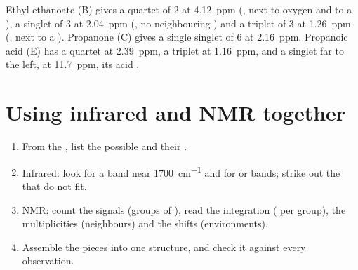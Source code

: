 \begin{example}\label{ex:g12:proton-nmr:reading}
Ethyl ethanoate (B) gives a quartet of 2  at \qty{4.12}{ppm}
(, next to oxygen and to a ), a singlet of 3  at
\qty{2.04}{ppm} (, no neighbouring ) and a triplet of 3
 at \qty{1.26}{ppm} (, next to a ). Propanone (C)
gives a single singlet of 6  at \qty{2.16}{ppm}. Propanoic acid (E)
has a quartet at \qty{2.39}{ppm}, a triplet at \qty{1.16}{ppm}, and a
singlet far to the left, at \qty{11.7}{ppm}, its acid .
\end{example}

\section{Using infrared and NMR together}


\begin{method}\label{met:g12:proton-nmr:identify}
\begin{enumerate}
  \item From the , list the possible  and their
        .
  \item Infrared: look for a  band near \qty{1700}{cm^{-1}} and
        for  or  bands; strike out the  that do
        not fit.
  \item NMR: count the signals (groups of ), read the
        integration ( per group), the multiplicities (neighbours)
        and the shifts (environments).
  \item Assemble the pieces into one structure, and check it against every
        observation.
\end{enumerate}
\end{method}

